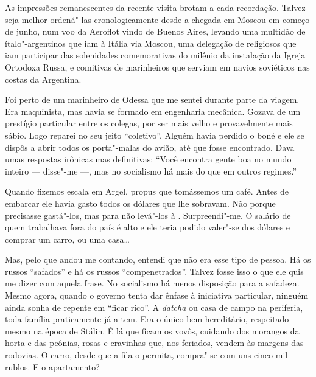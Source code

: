 As impressões remanescentes da recente visita brotam a cada recordação.
Talvez seja melhor ordená"-las cronologicamente desde a chegada em Moscou
em começo de junho, num voo da Aeroflot vindo de Buenos Aires, levando
uma multidão de ítalo"-argentinos que iam à Itália via Moscou, uma
delegação de religiosos que iam participar das solenidades comemorativas
do milênio da instalação da Igreja Ortodoxa Russa, e comitivas de
marinheiros que serviam em navios soviéticos nas costas da Argentina.

Foi perto de um marinheiro de Odessa que me sentei durante parte da
viagem. Era maquinista, mas havia se formado em engenharia mecânica.
Gozava de um prestígio particular entre os colegas, por ser mais velho e
provavelmente mais sábio. Logo reparei no seu jeito ``coletivo''. Alguém
havia perdido o boné e ele se dispôs a abrir todos os porta"-malas do
avião, até que fosse encontrado. Dava umas respostas irônicas mas
definitivas: ``Você encontra gente boa no mundo inteiro --- disse"-me ---,
mas no socialismo há mais do que em outros regimes.''

Quando fizemos escala em Argel, propus que tomássemos um café. Antes de
embarcar ele havia gasto todos os dólares que lhe sobravam. Não porque
precisasse gastá"-los, mas para não levá"-los à . Surpreendi"-me. O
salário de quem trabalhava fora do país é alto e ele teria podido
valer"-se dos dólares e comprar um carro, ou uma casa\ldots{}

Mas, pelo que andou me contando, entendi que não era esse tipo de
pessoa. Há os russos ``safados'' e há os russos ``compenetrados''.
Talvez fosse isso o que ele quis me dizer com aquela frase. No
socialismo há menos disposição para a safadeza. Mesmo agora, quando o
governo tenta dar ênfase à iniciativa particular, ninguém ainda sonha de
repente em ``ficar rico''. A \emph{datcha} ou casa de campo na
periferia, toda família praticamente já a tem. Era o único bem
hereditário, respeitado mesmo na época de Stálin. É lá que ficam os
vovôs, cuidando dos morangos da horta e das peônias, rosas e cravinhas
que, nos feriados, vendem às margens das rodovias. O carro, desde que a
fila o permita, compra"-se com uns cinco mil rublos. E o apartamento?

